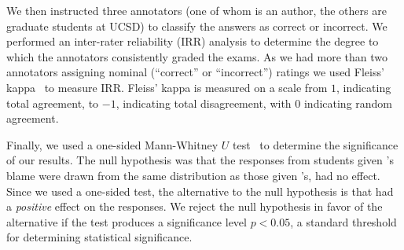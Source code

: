 We then instructed three annotators (one of whom is an author, the others
are graduate students at UCSD) to classify the answers as
correct or incorrect.
%
We performed an inter-rater reliability (IRR) analysis to determine the
degree to which the annotators consistently graded the exams.
%
As we had more than two annotators assigning nominal (``correct'' or
``incorrect'') ratings we used Fleiss' kappa~\cite{Fleiss1971-du} to
measure IRR.\@
%
Fleiss' kappa is measured on a scale from $1$, indicating total
agreement, to $-1$, indicating total disagreement, with $0$ indicating
random agreement.

Finally, we used a one-sided Mann-Whitney $U$ test~\cite{Mann1947-fd} to
determine the significance of our results.
%
The null hypothesis was that the responses from students given
\toolname's blame were drawn from the same distribution as those
given \sherrloc's, \ie \toolname had no effect.
%
Since we used a one-sided test, the alternative to the null hypothesis
is that \toolname had a \emph{positive} effect on the responses.
%
We reject the null hypothesis in favor of the alternative if the test
produces a significance level $p < 0.05$, a standard threshold for
determining statistical significance.





